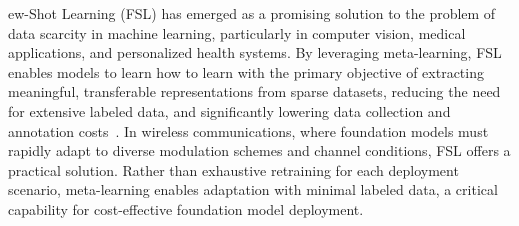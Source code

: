 


\noindent ew-Shot Learning (FSL) has emerged as a promising solution to the problem of data scarcity in machine learning, particularly in computer vision, medical applications, and personalized health systems\cite{nayem2023few, PFM_Ali, Event_Ali}. By leveraging meta-learning, FSL enables models to learn how to learn\cite{learn2learn} with the primary objective of extracting meaningful, transferable representations from sparse datasets, reducing the need for extensive labeled data, and significantly lowering data collection and annotation costs~\cite{metasgd, support, metagan}. In wireless communications, where foundation models must rapidly adapt to diverse modulation schemes and channel conditions, FSL offers a practical solution. Rather than exhaustive retraining for each deployment scenario, meta-learning enables adaptation with minimal labeled data, a critical capability for cost-effective foundation model deployment.

